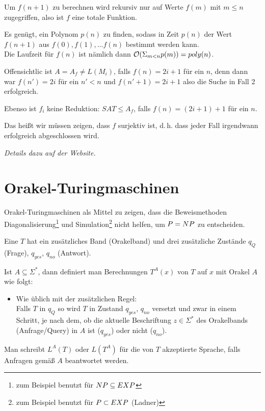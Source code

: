 Um $f(n+1)$ zu berechnen wird rekursiv nur auf Werte $f(m)$ mit $m \leq n$ zugegriffen, also ist $f$ eine totale Funktion.

Es genügt, ein Polynom $p(n)$ zu finden, sodass in Zeit $p(n)$ der Wert $f(n+1)$ aus $f(0), f(1), \dots f(n)$ bestimmt werden kann.\\
Die Laufzeit für $f(n)$ ist nämlich dann $\mathcal{O}(\Sigma_{m < n} p(m)) = poly(n)$.


Offensichtlic ist $A = A_f \neq L(M_i)$, falls $f(n) = 2i+1$ für ein $n$, denn dann war $f(n') = 2i$ für ein $n' < n$ und $f(n'+1) = 2i+1$ also die Suche in Fall 2 erfolgreich.

Ebenso ist $f_i$ keine Reduktion: $SAT \leq A_f$, falls $f(n) = (2i+1)+1$ für ein $n$.

Das heißt wir müssen zeigen, dass $f$ surjektiv ist, d.\,h. dass jeder Fall irgendwann erfolgreich abgeschlossen wird.


\textit{Details dazu auf der Website.}












\section{Orakel-Turingmaschinen}


Orakel-Turingmaschinen als Mittel zu zeigen, dass die Beweismethoden Diagonalisierung\footnote{zum Beispiel benutzt für $NP \subseteq EXP$} und Simulation\footnote{zum Beispiel benutzt für $P \subset EXP$ (Ladner)} nicht helfen, um $P = NP$ zu entscheiden.



\begin{definition}
    
    Eine  $T$ hat ein zusätzliches Band (Orakelband) und drei zusätzliche Zustände $q_Q$ (Frage), $q_{yes}$, $q_{no}$ (Antwort).

    Ist $A \subseteq \Sigma^\ast$, dann definiert man Berechnungen $T^A(x)$ von $T$ auf $x$ mit Orakel $A$ wie folgt:
    \begin{itemize}
        \item Wie üblich mit der zusätzlichen Regel:\\
            Falls $T$ in $q_Q$ so wird $T$ in Zustand $q_{yes}$, $q_{no}$ versetzt und zwar in einem Schritt, je nach dem, ob die aktuelle Beschriftung $z \in \Sigma^\ast$ des Orakelbands (Anfrage/Query) in $A$ ist ($q_{yes}$) oder nicht ($q_{no}$).
    \end{itemize}
    Man schreibt $L^A(T)$ oder $L(T^A)$ für die von $T$ akzeptierte Sprache, falls Anfragen gemäß $A$ beantwortet werden.

\end{definition}




